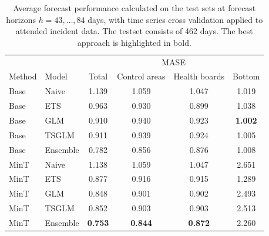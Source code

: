 \documentclass[
  authoryear,
  preprint,
  3p]{elsarticle}
\begin{document}
\begin{table}

\caption{\label{tbl-result}Average forecast performance calculated on
the test sets at forecast horizons \(h=43,\dots,84\) days, with time
series cross validation applied to attended incident data. The testset
consists of 462 days. The best approach is highlighted in
bold.}\begin{minipage}[t]{\linewidth}

{\centering 

\tabularnewline

\centering
\begin{tabular}[t]{llcccc}
\toprule
\multicolumn{2}{c}{ } & \multicolumn{4}{c}{MASE} \\
\cmidrule(l{3pt}r{3pt}){3-6}
Method & Model & Total & Control areas & Health boards & Bottom\\
\midrule
Base & Naive & 1.139 & 1.059 & 1.047 & 1.019\\
Base & ETS & 0.963 & 0.930 & 0.899 & 1.038\\
Base & GLM & 0.910 & 0.940 & 0.923 & \textbf{1.002}\\
Base & TSGLM & 0.911 & 0.939 & 0.924 & 1.005\\
Base & Ensemble & 0.782 & 0.856 & 0.876 & 1.008\\
\addlinespace
MinT & Naive & 1.138 & 1.059 & 1.047 & 2.651\\
MinT & ETS & 0.877 & 0.916 & 0.915 & 1.289\\
MinT & GLM & 0.848 & 0.901 & 0.902 & 2.493\\
MinT & TSGLM & 0.852 & 0.903 & 0.903 & 2.513\\
MinT & Ensemble & \textbf{0.753} & \textbf{0.844} & \textbf{0.872} & 2.260\\
\bottomrule
\end{tabular}

}

\end{minipage}%
\newline
\begin{minipage}[t]{\linewidth}

{\centering 

\tabularnewline

}
\end{minipage}
\end{table}
\end{document}
